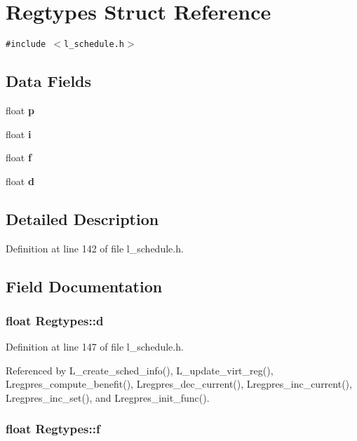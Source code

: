 \section{Regtypes Struct Reference}
\label{structRegtypes}
{\tt \#include $<$l\_\-schedule.h$>$}

\subsection*{Data Fields}
\begin{CompactItemize}
\item 
float \bf{p}
\item 
float \bf{i}
\item 
float \bf{f}
\item 
float \bf{d}
\end{CompactItemize}


\subsection{Detailed Description}




Definition at line 142 of file l\_\-schedule.h.

\subsection{Field Documentation}
\subsubsection{\setlength{\rightskip}{0pt plus 5cm}float \bf{Regtypes::d}}\label{structRegtypes_558a146c9877f5814d90732d3e452c45}




Definition at line 147 of file l\_\-schedule.h.

Referenced by L\_\-create\_\-sched\_\-info(), L\_\-update\_\-virt\_\-reg(), Lregpres\_\-compute\_\-benefit(), Lregpres\_\-dec\_\-current(), Lregpres\_\-inc\_\-current(), Lregpres\_\-inc\_\-set(), and Lregpres\_\-init\_\-func().
\subsubsection{\setlength{\rightskip}{0pt plus 5cm}float \bf{Regtypes::f}}\label{structRegtypes_bb3424a959a936d3fc7861b73c34924e}





